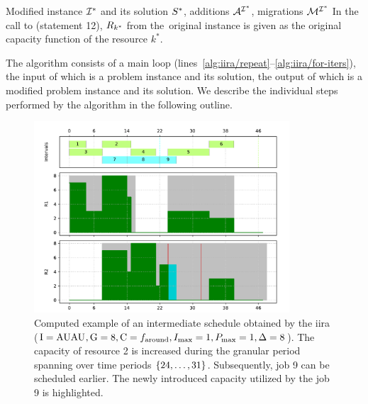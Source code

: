 \begin{algorithm}[t]
\begin{algorithmic}[1]
\Output  Modified instance $\mathcal{I}^*$ and its solution $S^*$,
\Outputc additions $\mathcal{A}^{\mathcal{I}^*}$, migrations $\mathcal{M}^{\mathcal{I}^*}$
\Statex
\Note In the call to  (statement 12),
      $R_{k^*}$ from the~original instance is given as the original capacity function of the resource $k^*$.

\end{algorithmic}
\end{algorithm}

The algorithm consists of a main loop (lines~\ref{alg:iira/repeat}--\ref{alg:iira/for-iters}),
the input of which is a problem instance and its solution,
the output of which is a modified problem instance and its solution.
We describe the individual steps performed by the algorithm in the following outline.

\begin{figure}[p]
    \centering
    \includegraphics[width=0.85\textwidth]{img/example_solution_iira_intermediate.pdf}
    \caption{
        Computed example of an intermediate schedule obtained by the \ac{iira}
        ($\mathrm{I} = \operatorname{AUAU}_{}, \mathrm{G} = 8, \mathrm{C} = f_{\text{around}}, I_{\max} = 1, P_{\max} = 1, \Delta = 8$).
        The capacity of resource 2 is increased during the granular period
        spanning over time periods $\{{24}, \dots, {31}\}$.
        Subsequently, job 9 can be scheduled earlier.
        The newly introduced capacity utilized by the job 9 is highlighted.
    }
    \label{fig:example/iira-step}
\end{figure}

